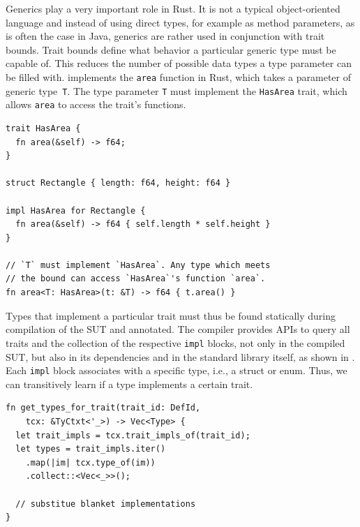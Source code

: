 \documentclass[paper=a4,%
  twoside,%
  BCOR4mm,%
  abstract=true,%
  toc=bibliography,%
  chapterprefix=true,%
  toc=bibliographynumbered,%
  open=right,%
  english,%
  pagesize=pdftex]{scrreprt}
\newcommand{\sut}{\ac{SUT}\xspace}
\begin{document}
Generics play a very important role in Rust. It is not a typical object-oriented language and instead of using direct types, for example as method parameters, as is often the case in Java, generics are rather used in conjunction with trait bounds. Trait bounds define what behavior a particular generic type must be capable of. This reduces the number of possible data types a type parameter can be filled with.  implements the \texttt{area} function in Rust, which takes a parameter of generic type~\texttt{T}. The type parameter \texttt{T} must implement the \texttt{HasArea} trait, which allows \texttt{area} to access the trait's functions. %

\begin{lstlisting}[style=boxed, caption={A function that takes a generic types and specifies a bound}, label=lst:trait-bounds-example]
trait HasArea {
  fn area(&self) -> f64;
}

struct Rectangle { length: f64, height: f64 }

impl HasArea for Rectangle {
  fn area(&self) -> f64 { self.length * self.height }
}

// `T` must implement `HasArea`. Any type which meets
// the bound can access `HasArea`'s function `area`.
fn area<T: HasArea>(t: &T) -> f64 { t.area() }
\end{lstlisting}

Types that implement a particular trait must thus be found statically during compilation of the \sut and annotated. The compiler provides \acp{API} to query all traits and the collection of the respective \texttt{impl} blocks, not only in the compiled \sut, but also in its dependencies and in the standard library itself, as shown in . Each \texttt{impl} block associates with a specific type, i.e., a struct or enum. Thus, we can transitively learn if a type implements a certain trait.

\begin{lstlisting}[style=boxed, caption={Query types for a trait}, label=lst:query-types-that-implement-trait]
fn get_types_for_trait(trait_id: DefId,
    tcx: &TyCtxt<'_>) -> Vec<Type> {
  let trait_impls = tcx.trait_impls_of(trait_id);
  let types = trait_impls.iter()
    .map(|im| tcx.type_of(im))
    .collect::<Vec<_>>();

  // substitue blanket implementations
}
\end{lstlisting}
\end{document}

